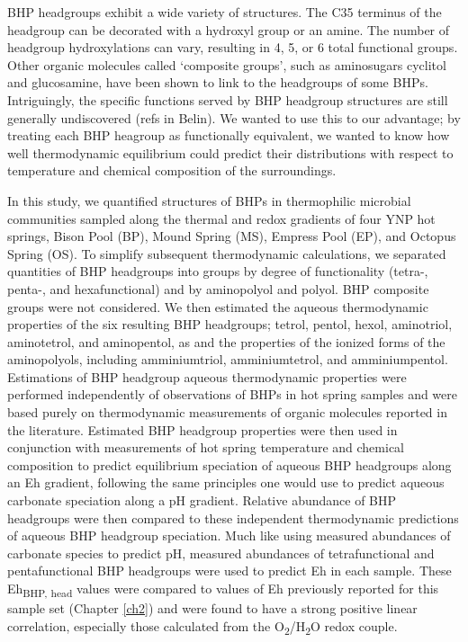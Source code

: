 BHP headgroups exhibit a wide variety of structures. The C35 terminus of the headgroup can be decorated with a hydroxyl group or an amine. The number of headgroup hydroxylations can vary, resulting in 4, 5, or 6 total functional groups. Other organic molecules called `composite groups', such as aminosugars cyclitol and glucosamine, have been shown to link to the headgroups of some BHPs. Intriguingly, the specific functions served by BHP headgroup structures are still generally undiscovered (refs in Belin). We wanted to use this to our advantage; by treating each BHP heagroup as functionally equivalent, we wanted to know how well thermodynamic equilibrium could predict their distributions with respect to temperature and chemical composition of the surroundings.

In this study, we quantified structures of BHPs in thermophilic microbial communities sampled along the thermal and redox gradients of four YNP hot springs, Bison Pool (BP), Mound Spring (MS), Empress Pool (EP), and Octopus Spring (OS). To simplify subsequent thermodynamic calculations, we separated quantities of BHP headgroups into groups by degree of functionality (tetra-, penta-, and hexafunctional) and by aminopolyol and polyol. BHP composite groups were not considered. We then estimated the aqueous thermodynamic properties of the six resulting BHP headgroups; tetrol, pentol, hexol, aminotriol, aminotetrol, and aminopentol, as and the properties of the ionized forms of the aminopolyols, including amminiumtriol, amminiumtetrol, and amminiumpentol. Estimations of BHP headgroup aqueous thermodynamic properties were performed independently of observations of BHPs in hot spring samples and were based purely on thermodynamic measurements of organic molecules reported in the literature. Estimated BHP headgroup properties were then used in conjunction with measurements of hot spring temperature and chemical composition to predict equilibrium speciation of aqueous BHP headgroups along an Eh gradient, following the same principles one would use to predict aqueous carbonate speciation along a pH gradient. Relative abundance of BHP headgroups were then compared to these independent thermodynamic predictions of aqueous BHP headgroup speciation. Much like using measured abundances of carbonate species to predict pH, measured abundances of tetrafunctional and pentafunctional BHP headgroups were used to predict Eh in each sample. These Eh\textsubscript{BHP, head} values were compared to values of Eh previously reported for this sample set (Chapter \ref{ch2}) and were found to have a strong positive linear correlation, especially those calculated from the O\textsubscript{2}/H\textsubscript{2}O redox couple.


